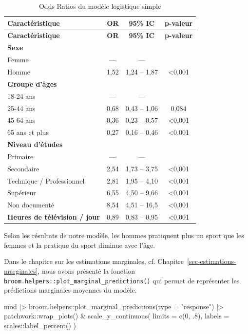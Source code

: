\documentclass[
  letterpaper,
  DIV=11,
  numbers=noendperiod,
  oneside]{scrreprt}
\newenvironment{Shaded}{\begin{snugshade}}{\end{snugshade}}
\newcommand{\AttributeTok}[1]{\textcolor[rgb]{0.40,0.45,0.13}{#1}}
\newcommand{\DecValTok}[1]{\textcolor[rgb]{0.68,0.00,0.00}{#1}}
\newcommand{\FunctionTok}[1]{\textcolor[rgb]{0.28,0.35,0.67}{#1}}
\newcommand{\NormalTok}[1]{\textcolor[rgb]{0.00,0.23,0.31}{#1}}
\newcommand{\SpecialCharTok}[1]{\textcolor[rgb]{0.37,0.37,0.37}{#1}}
\newcommand{\StringTok}[1]{\textcolor[rgb]{0.13,0.47,0.30}{#1}}
\begin{document}
\hypertarget{tbl-or-modele-simple}{}
\begin{longtable}[]{@{}lccc@{}}
\caption{\label{tbl-or-modele-simple}Odds Ratios du modèle logistique
simple}\tabularnewline
\toprule()
\textbf{Caractéristique} & \textbf{OR} & \textbf{95\% IC} &
\textbf{p-valeur} \\
\midrule()
\endfirsthead
\toprule()
\textbf{Caractéristique} & \textbf{OR} & \textbf{95\% IC} &
\textbf{p-valeur} \\
\midrule()
\endhead
\textbf{Sexe} & & & \\
Femme & --- & --- & \\
Homme & 1,52 & 1,24 -- 1,87 & \textless0,001 \\
\textbf{Groupe d'âges} & & & \\
18-24 ans & --- & --- & \\
25-44 ans & 0,68 & 0,43 -- 1,06 & 0,084 \\
45-64 ans & 0,36 & 0,23 -- 0,57 & \textless0,001 \\
65 ans et plus & 0,27 & 0,16 -- 0,46 & \textless0,001 \\
\textbf{Niveau d'études} & & & \\
Primaire & --- & --- & \\
Secondaire & 2,54 & 1,73 -- 3,75 & \textless0,001 \\
Technique / Professionnel & 2,81 & 1,95 -- 4,10 & \textless0,001 \\
Supérieur & 6,55 & 4,50 -- 9,66 & \textless0,001 \\
Non documenté & 8,54 & 4,51 -- 16,5 & \textless0,001 \\
\textbf{Heures de télévision / jour} & 0,89 & 0,83 -- 0,95 &
\textless0,001 \\
\bottomrule()
\end{longtable}

Selon les résultats de notre modèle, les hommes pratiquent plus un sport
que les femmes et la pratique du sport diminue avec l'âge.

Dans le chapitre sur les estimations marginales, cf.
Chapitre~\ref{sec-estimations-marginales}, nous avons présenté la
fonction \texttt{broom.helpers::plot\_marginal\_predictions()} qui
permet de représenter les prédictions marginales moyennes du modèle.

\begin{Shaded}
\begin{Highlighting}[]
\NormalTok{mod }\SpecialCharTok{|\textgreater{}} 
\NormalTok{  broom.helpers}\SpecialCharTok{::}\FunctionTok{plot\_marginal\_predictions}\NormalTok{(}\AttributeTok{type =} \StringTok{"response"}\NormalTok{) }\SpecialCharTok{|\textgreater{}} 
\NormalTok{  patchwork}\SpecialCharTok{::}\FunctionTok{wrap\_plots}\NormalTok{() }\SpecialCharTok{\&}
  \FunctionTok{scale\_y\_continuous}\NormalTok{(}
    \AttributeTok{limits =} \FunctionTok{c}\NormalTok{(}\DecValTok{0}\NormalTok{, .}\DecValTok{8}\NormalTok{),}
    \AttributeTok{labels =}\NormalTok{ scales}\SpecialCharTok{::}\FunctionTok{label\_percent}\NormalTok{()}
\NormalTok{  )}
\end{Highlighting}
\end{Shaded}
\end{document}
